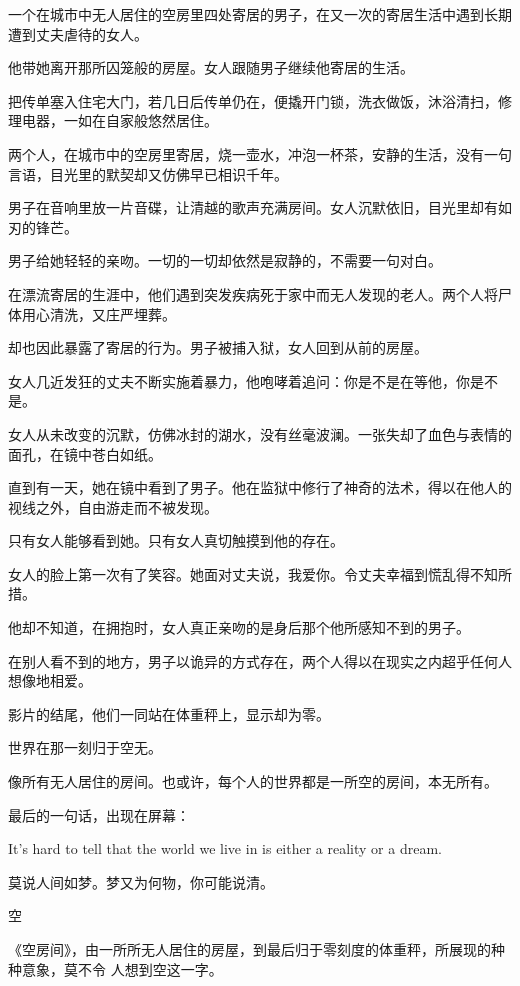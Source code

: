 \documentclass[12pt,a4paper]{article}
\newcommand{\subpart}[1]{
	\begingroup \par
	\vspace{1ex} \centering #1
	\par \endgroup \nopagebreak[4]
}
\begin{document}
		一个在城市中无人居住的空房里四处寄居的男子，在又一次的寄居生活中遇到长期遭到丈夫虐待的女人。\par
		他带她离开那所囚笼般的房屋。女人跟随男子继续他寄居的生活。\par
		把传单塞入住宅大门，若几日后传单仍在，便撬开门锁，洗衣做饭，沐浴清扫，修理电器，一如在自家般悠然居住。\par
		两个人，在城市中的空房里寄居，烧一壶水，冲泡一杯茶，安静的生活，没有一句言语，目光里的默契却又仿佛早已相识千年。\par
		男子在音响里放一片音碟，让清越的歌声充满房间。女人沉默依旧，目光里却有如刃的锋芒。\par
		男子给她轻轻的亲吻。一切的一切却依然是寂静的，不需要一句对白。\par
		在漂流寄居的生涯中，他们遇到突发疾病死于家中而无人发现的老人。两个人将尸体用心清洗，又庄严埋葬。\par
		却也因此暴露了寄居的行为。男子被捕入狱，女人回到从前的房屋。\par
		女人几近发狂的丈夫不断实施着暴力，他咆哮着追问：你是不是在等他，你是不是。\par
		女人从未改变的沉默，仿佛冰封的湖水，没有丝毫波澜。一张失却了血色与表情的面孔，在镜中苍白如纸。\par
		直到有一天，她在镜中看到了男子。他在监狱中修行了神奇的法术，得以在他人的视线之外，自由游走而不被发现。\par
		只有女人能够看到她。只有女人真切触摸到他的存在。\par
		女人的脸上第一次有了笑容。她面对丈夫说，我爱你。令丈夫幸福到慌乱得不知所措。\par
		他却不知道，在拥抱时，女人真正亲吻的是身后那个他所感知不到的男子。\par
		在别人看不到的地方，男子以诡异的方式存在，两个人得以在现实之内超乎任何人想像地相爱。\par
		影片的结尾，他们一同站在体重秤上，显示却为零。\par
		世界在那一刻归于空无。\par
		像所有无人居住的房间。也或许，每个人的世界都是一所空的房间，本无所有。\par
		最后的一句话，出现在屏幕：\par
		It's hard to tell that the world we live in is either a reality or a dream.

		莫说人间如梦。梦又为何物，你可能说清。


		\subpart{空}

		《空房间》，由一所所无人居住的房屋，到最后归于零刻度的体重秤，所展现的种种意象，莫不令
	人想到空这一字。
\end{document}

